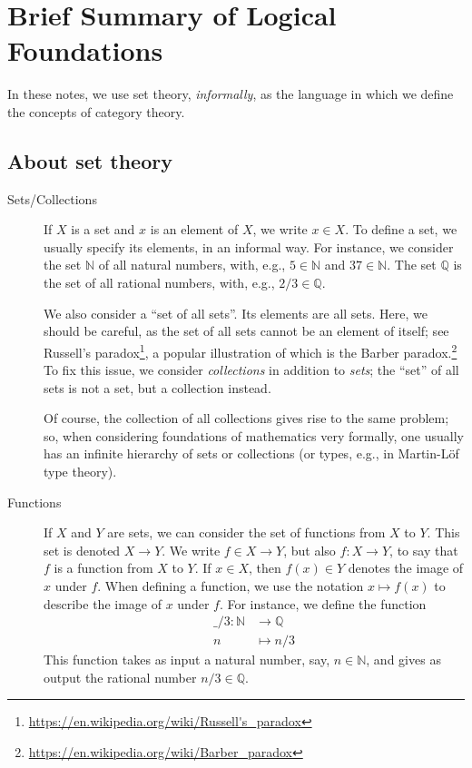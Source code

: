 \documentclass[a4paper,11pt, oneside,titlepage=false]{scrbook}
\theoremstyle{plain}
\theoremstyle{definition}
\newcommand{\NN}{\ensuremath{\mathbb{N}}}
\newcommand{\QQ}{\ensuremath{\mathbb{Q}}}
\begin{document}
\chapter{Brief Summary of Logical Foundations}
\label{sec:notation}

In these notes, we use set theory, \emph{informally}, as the language in which we define the concepts of category theory.

\section{About set theory}

\begin{description}
\item [Sets/Collections] If $X$ is a set and $x$ is an element of $X$, we write $x \in X$.
  To define a set, we usually specify its elements, in an informal way.
  For instance, we consider the set $\NN$ of all natural numbers, with, e.g., $5 \in \NN$ and $37 \in \NN$.
  The set $\QQ$ is the set of all rational numbers, with, e.g., $2/3 \in \QQ$.

  We also consider a ``set of all sets''. Its elements are all sets.
  Here, we should be careful, as the set of all sets cannot be an element of itself; see Russell's paradox\footnote{\url{https://en.wikipedia.org/wiki/Russell's_paradox}}, a popular illustration of which is the Barber paradox.\footnote{\url{https://en.wikipedia.org/wiki/Barber_paradox}}
  To fix this issue, we consider \emph{collections} in addition to \emph{sets};
  the ``set'' of all sets is not a set, but a collection instead.

  Of course, the collection of all collections gives rise to the same problem;
  so, when considering foundations of mathematics very formally, one usually has an infinite hierarchy of sets or collections (or types, e.g., in Martin-Löf type theory).

\item [Functions] If $X$ and $Y$ are sets, we can consider the set of functions from $X$ to $Y$. This set is denoted $X \to Y$. We write $f \in X \to Y$, but also $f : X \to Y$, to say that $f$ is a function from $X$ to $Y$.
  If $x \in X$, then $f(x) \in Y$ denotes the image of $x$ under $f$.
  When defining a function, we use the notation $x \mapsto f(x)$ to describe the image of $x$ under $f$. For instance, we define the function
  \begin{align*}
    \_/3 : \NN &\to \QQ
    \\
    n & \mapsto n/3
  \end{align*}
  This function takes as input a natural number, say, $n \in \NN$, and gives as output the rational number $n/3 \in \QQ$.


\end{description}
\end{document}
